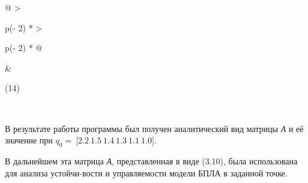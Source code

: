 \begin{longtable}{@{}
  >{\raggedright\arraybackslash}p{(\columnwidth - 2\tabcolsep) * }
  >{\raggedright\arraybackslash}p{(\columnwidth - 2\tabcolsep) * }@{}}
\begin{minipage}[b]{\linewidth}
\begin{pmatrix}
\begin{matrix}
\begin{matrix}
\begin{matrix}
\begin{matrix}
\end{matrix}
\end{matrix}
\end{matrix}
\end{matrix}
\end{pmatrix}\)
\end{minipage} & \begin{minipage}[b]{\linewidth}\raggedright
(14)
\end{minipage} \\

\end{longtable}


В результате работы программы был получен аналитический вид матрицы
\emph{А} и её значение при
\(q_{0} = \ \lbrack 2.2\ 1.5\ 1.4\ 1.3\ 1.1\ 1.0\rbrack\).

В дальнейшем эта матрица \emph{А}, представленная в виде (3.10), была
использована для анализа устойчи-вости и управляемости модели БПЛА в
заданной точке.
